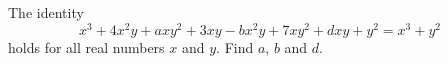 The identity
\[x^3+4x^2y+axy^2+3xy-bx^2y+7xy^2+dxy+y^2=x^3+y^2\]
holds for all real numbers $x$ and $y$. Find $a$, $b$ and $d$.
